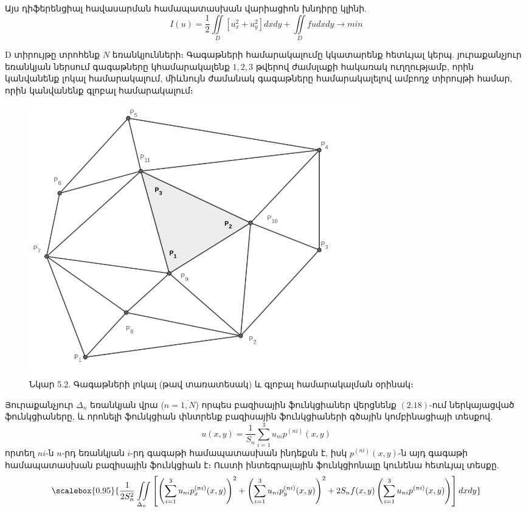 \documentclass[fleqn, bachelor,subf,12pt,notitlepage]{article}
\newcommand\scalemath[2]{\scalebox{#1}{\mbox{\ensuremath{\displaystyle #2}}}}
\begin{document}
Այս դիֆերենցիալ հավասարման  համապատասխան վարիացիոն խնդիրը կլինի.
\begin{equation}
I(u) = \frac{1}{2}\iint \limits_{D} \left[u_x^2 + u_y^2 \right]dxdy + \iint \limits_{D} fudxdy \longrightarrow min
\end{equation}

D տիրույթը տրոհենք $N$ եռանկյունների։ Գագաթների համարակալումը կկատարենք հետևյալ կերպ. յուրաքանչյուր եռանկյան ներսում գագաթները կհամարակալենք $1, 2, 3$ թվերով ժամսլաքի հակառակ ուղղությամբ, որին կանվանենք լոկալ համարակալում, միևնույն ժամանակ գագաթները համարակալելով ամբողջ տիրույթի համար, որին կանվանենք գլոբալ համարակալում։ 
\begin{figure}[H]
\centering
\includegraphics[width=0.7\textwidth]{images/global_and_local_numbering}
\captionsetup{labelformat=empty}
\caption{Նկար 5.2. Գագաթների լոկալ (թավ տառատեսակ) և գլոբալ համարակալման օրինակ։}
\end{figure}
Յուրաքանչյուր $\Delta_{n}$ եռանկյան վրա ($n=\overline{1, N}$) որպես բազիսային ֆունկցիաներ վերցնենք $\left(2.18\right)$-ում ներկայացված ֆունկցիաները, և որոնելի ֆունկցիան փնտրենք բազիսային ֆունկցիաների գծային կոմբինացիայի տեսքով.
\begin{equation}
u(x, y) = \dfrac{1}{S_{n}}\sum_{i=1}^{3}u_{ni}p^{(ni)}(x,y)
\end{equation}
որտեղ $ni$-ն $n$-րդ եռանկյան $i$-րդ գագաթի համապատասխան ինդեքսն է, իսկ $p^{(ni)}(x,y)$-ն այդ գագաթի համապատասխան բազիսային ֆունկցիան է։
Ուստի ինտեգրալային ֆունկցիոնալը կունենա հետևյալ տեսքը.
\begin{equation}
$$\scalemath{0.95}{\frac{1}{2S_{n}^{2}} \iint \limits_{\Delta_{n}}\left[\left(\sum_{i=1}^{3}u_{ni}p^{(ni)}_{x}(x,y)\right)^2 + \left(\sum_{i=1}^{3}u_{ni}p^{(ni)}_{y}(x,y)\right)^2 +2S_{n}f(x,y)\left(\sum_{i=1}^{3}u_{ni}p^{(ni)}(x,y)\right)\right]dxdy}
\end{equation}
\end{document}
